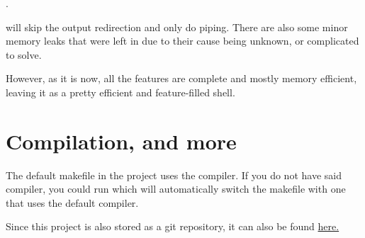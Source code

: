 \documentclass[12pt, a4paper]{report}
\begin{document}
        . 
        
        will skip the output redirection and only do piping.
        There are also some minor memory leaks \tx{[<300 bytes]} that were left
        in due to their cause being unknown, or complicated to solve.

        However, as it is now, all the features are complete and mostly memory
        efficient, leaving it as a pretty efficient and feature-filled shell.

        \section{Compilation, and more}
        
        The default makefile in the project uses the  compiler. If 
        you do not have said compiler, you could run  which 
        will automatically switch the makefile with one that uses the default
         compiler. 

        Since this project is also stored as a git repository, it can also be found
        \href{https://github.com/MasterTextman/eggshell}{here.} 
\end{document}
